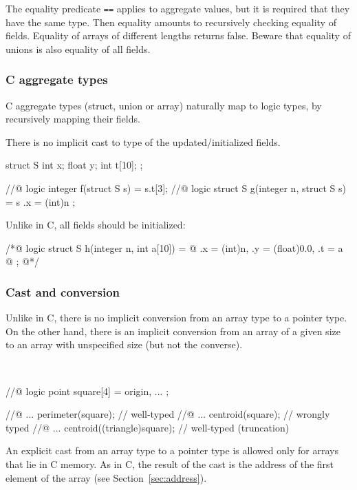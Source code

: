 The equality predicate \lstinline|==| applies to aggregate values, but it
is required that they have the same type. Then equality amounts to
recursively checking equality of fields.  Equality of arrays of different
lengths returns false.  Beware that equality of unions is also
equality of all fields.


\subsubsection{C aggregate types}

C aggregate types (struct, union or array) naturally map to logic
types, by recursively mapping their fields.

\begin{example}
There is no implicit cast to type of the updated/initialized fields.
\begin{listing-nonumber}
struct S { int x; float y; int t[10]; };

//@ logic integer f(struct S s) = s.t[3];
//@ logic struct S g(integer n, struct S s) = { s \with .x = (int)n };
\end{listing-nonumber}
Unlike in C, all fields should be initialized:
\begin{listing-nonumber}
/*@ logic struct S h(integer n, int a[10]) = {
  @   .x = (int)n, .y = (float)0.0, .t = a
  @   };
  @*/
\end{listing-nonumber}
\end{example}

\subsubsection{Cast and conversion}

Unlike in C, there is no implicit conversion from an array type to a
pointer type. On the other hand, there is an implicit conversion from
an array of a given size to an array with unspecified size (but not
the converse).

\begin{example}
~
\begin{listing-nonumber}
//@ logic point square[4] = { origin, ... };

//@ ... perimeter(square);          // well-typed
//@ ... centroid(square);           // wrongly typed
//@ ... centroid((triangle)square); // well-typed (truncation)
\end{listing-nonumber}
\end{example}

An explicit cast from an array type to a pointer type is allowed only
for arrays that lie in C memory. As in C, the result of the cast is
the address of the first element of the array (see
Section~\ref{sec:address}).

